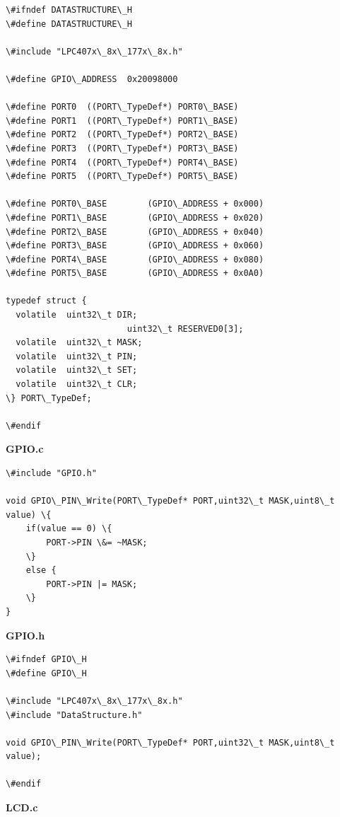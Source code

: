 \documentclass{article}
\begin{document}
\begin{lstlisting}
\#ifndef DATASTRUCTURE\_H
\#define DATASTRUCTURE\_H

\#include "LPC407x\_8x\_177x\_8x.h"

\#define GPIO\_ADDRESS	0x20098000

\#define PORT0	((PORT\_TypeDef*) PORT0\_BASE)
\#define PORT1	((PORT\_TypeDef*) PORT1\_BASE)
\#define PORT2	((PORT\_TypeDef*) PORT2\_BASE)
\#define PORT3	((PORT\_TypeDef*) PORT3\_BASE)
\#define PORT4	((PORT\_TypeDef*) PORT4\_BASE)
\#define PORT5	((PORT\_TypeDef*) PORT5\_BASE)

\#define PORT0\_BASE		(GPIO\_ADDRESS + 0x000)
\#define PORT1\_BASE		(GPIO\_ADDRESS + 0x020)
\#define PORT2\_BASE		(GPIO\_ADDRESS + 0x040)
\#define PORT3\_BASE		(GPIO\_ADDRESS + 0x060)
\#define PORT4\_BASE		(GPIO\_ADDRESS + 0x080)
\#define PORT5\_BASE		(GPIO\_ADDRESS + 0x0A0)

typedef struct {
  volatile	uint32\_t DIR;
						uint32\_t RESERVED0[3];
  volatile	uint32\_t MASK;
  volatile	uint32\_t PIN;
  volatile	uint32\_t SET;
  volatile  uint32\_t CLR;
\} PORT\_TypeDef;

\#endif
\end{lstlisting}
\linebreak
\textbf{GPIO.c}
\begin{lstlisting}
\#include "GPIO.h"

void GPIO\_PIN\_Write(PORT\_TypeDef* PORT,uint32\_t MASK,uint8\_t value) \{
	if(value == 0) \{
		PORT->PIN \&= ~MASK;
	\}
	else {
		PORT->PIN |= MASK;
	\}
}
\end{lstlisting}
\linebreak
\textbf{GPIO.h}
\begin{lstlisting}
\#ifndef GPIO\_H
\#define GPIO\_H

\#include "LPC407x\_8x\_177x\_8x.h"
\#include "DataStructure.h"

void GPIO\_PIN\_Write(PORT\_TypeDef* PORT,uint32\_t MASK,uint8\_t value);

\#endif
\end{lstlisting}
\linebreak
\textbf{LCD.c}
\end{document}
